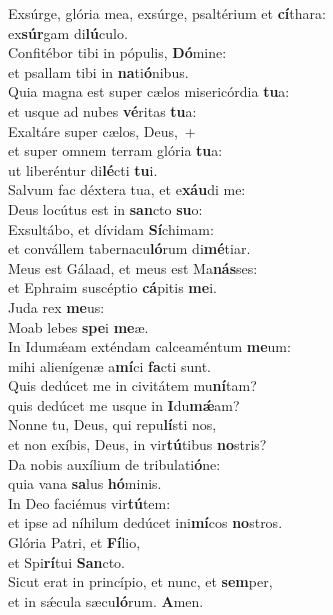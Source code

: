 \evenverse Exsúrge, glória mea, exsúrge, psaltérium et \textbf{cí}thara:~\*\\
\evenverse ex\textbf{súr}gam di\textbf{lú}culo.\\
\oddverse Confitébor tibi in pópulis, \textbf{Dó}mine:~\*\\
\oddverse et psallam tibi in \textbf{na}ti\textbf{ó}nibus.\\
\evenverse Quia magna est super cælos misericórdia \textbf{tu}a:~\*\\
\evenverse et usque ad nubes \textbf{vé}ritas \textbf{tu}a:\\
\oddverse Exaltáre super cælos, Deus,~+\\
\oddverse  et super omnem terram glória \textbf{tu}a:~\*\\
\oddverse ut liberéntur di\textbf{lé}cti \textbf{tu}i.\\
\evenverse Salvum fac déxtera tua, et e\textbf{xáu}di me:~\*\\
\evenverse Deus locútus est in \textbf{san}cto \textbf{su}o:\\
\oddverse Exsultábo, et dívidam \textbf{Sí}chimam:~\*\\
\oddverse et convállem tabernacu\textbf{ló}rum di\textbf{mé}tiar.\\
\evenverse Meus est Gálaad, et meus est Ma\textbf{nás}ses:~\*\\
\evenverse et Ephraim suscéptio \textbf{cá}pitis \textbf{me}i.\\
\oddverse Juda rex \textbf{me}us:~\*\\
\oddverse Moab lebes \textbf{spe}i \textbf{me}æ.\\
\evenverse In Idumǽam exténdam calceaméntum \textbf{me}um:~\*\\
\evenverse mihi alienígenæ a\textbf{mí}ci \textbf{fa}cti sunt.\\
\oddverse Quis dedúcet me in civitátem mu\textbf{ní}tam?~\*\\
\oddverse quis dedúcet me usque in \textbf{I}du\textbf{mǽ}am?\\
\evenverse Nonne tu, Deus, qui repu\textbf{lí}sti nos,~\*\\
\evenverse et non exíbis, Deus, in vir\textbf{tú}tibus \textbf{no}stris?\\
\oddverse Da nobis auxílium de tribulati\textbf{ó}ne:~\*\\
\oddverse quia vana \textbf{sa}lus \textbf{hó}minis.\\
\evenverse In Deo faciémus vir\textbf{tú}tem:~\*\\
\evenverse et ipse ad níhilum dedúcet ini\textbf{mí}cos \textbf{no}stros.\\
\oddverse Glória Patri, et \textbf{Fí}lio,~\*\\
\oddverse et Spi\textbf{rí}tui \textbf{San}cto.\\
\evenverse Sicut erat in princípio, et nunc, et \textbf{sem}per,~\*\\
\evenverse et in sǽcula sæcu\textbf{ló}rum. \textbf{A}men.\\
